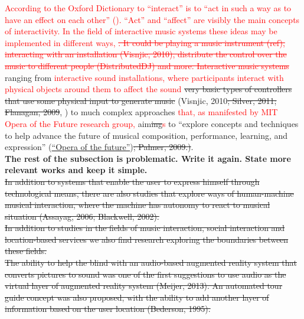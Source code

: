\documentclass[a4paper,11pt]{article}
\begin{document}
\textcolor{red}{According to the Oxford Dictionary to ``interact'' is to ``act in such a way as to have an effect on each other'' (}\textcolor{red}{). ``Act'' and ``affect'' are visibly the main concepts of interactivity. In the field of interactive music systems these ideas may be implemented in different ways, \st{. It could be playing a music instrument (ref), interacting with an installation (Visnjic, 2010), distribute the control over the music to different people (DistributedDJ) and more. Interactive music systems}} ranging from \textcolor{red}{interactive sound installations, where participants interact with physical objects around them to affect the sound} \st{very basic types of controllers that use some physical input to generate music} (Visnjic, 2010\st{; Silver, 2011; Flanagan, 2009}, \href{http://createdigitalmusic.com/2012/10/at-musicmakers-experiencing-music-through-design-as-community-of-doers-collaborates-listen-watch/}{}) to much complex approaches \textcolor{red}{that, as manifested by MIT Opera of the Future research group,} aim\st{ing}\textcolor{red}{s} to ``explore concepts and techniques to help advance the future of musical composition, performance, learning, and expression'' (\href{http://www.media.mit.edu/research/groups/opera-future}{``Opera of the future''})\st{; Palmer, 2009.)}.\\

\textbf{The rest of the subsection is problematic. Write it again. State more relevant works and keep it simple.}\\

\st{In addition to systems that enable the user to express himself through technological means, there are also studies that explore ways of human-machine musical interaction, where the machine has autonomy to react to musical situation (Assayag, 2006; Blackwell, 2002).}\\

\st{In addition to studies in the fields of music interaction, social interaction and location-based services we also find research exploring the boundaries between these fields.}\\

\st{The ability to help the blind with an audio-based augmented reality system that converts pictures to sound was one of the first suggestions to use audio as the virtual layer of augmented reality system (Meijer, 2013). An automated tour guide concept was also proposed, with the ability to add another layer of information based on the user location (Bederson, 1995).}\\
\end{document}
